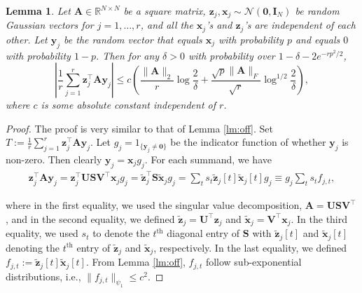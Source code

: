 \documentclass[10pt]{article}
\newcommand{\B}{\mathbf}
\newtheorem{lemma}[theorem]{Lemma}
\begin{document}
\begin{lemma}\label{lm:off2} Let $\B{A}\in \mathbb{R}^{N \times N}$ be a square matrix, $\B{z}_j, \B{x}_j\sim \mathcal{N}(\B{0},\B{I}_N)$ be random Gaussian vectors for $j=1,\ldots,r$, and all the $\B{x}_j$'s and $\B{z}_j$'s are independent of each other. Let $\B{y}_j$ be the random vector that equals $\B{x}_j$ with probability $p$ and equals $0$ with probability $1-p$. Then for any $\delta>0$ with probability over $1-\delta-2e^{-rp^2/2}$,
\[
\left|\frac{1}{r} \sum\limits_{j=1}^{r} \B{z}_j^{\top}\B{A}\B{y}_j \right| \leq c \left( \frac{\|\B{A}\|_2}{r}\log \frac{2}{\delta} + \frac{\sqrt p \|\B{A}\|_F}{\sqrt r}\log^{1/2} \frac{2}{\delta}\right),
\]
where $c$ is some absolute constant independent of $r$.
\end{lemma}

\begin{proof}
The proof is very similar to that of Lemma \ref{lm:off}. Set $T:= \frac{1}{r} \sum\limits_{j=1}^{r} \B{z}_j^{\top}\B{A}\B{y}_j $. Let $g_j=1_{\{\B{y}_j \neq \B{0}\}}$ be the indicator function of whether $\B{y}_j$ is non-zero. Then clearly $\B{y}_j=\B{x}_j g_j$. For each summand, we have
\begin{align}
\B{z}_j^{\top}\B{A}\B{y}_j = \B{z}_j^{\top}\B{U}\B{S}\B{V}^{\top}\B{x}_j g_j = \tilde{\B{z}}_j^{\top}\B{S}\tilde{\B{x}}_j g_j = \sum_t s_t \tilde{\B{z}}_j[t]\tilde{\B{x}}_j[t] g_j\equiv g_j\sum_t s_t f_{j,t},
\end{align}

where in the first equality, we used the singular value decomposition, $\B{A}=\B{U}\B{S}\B{V}^{\top}$, and in the second equality, we defined $\tilde{\B{z}}_j = \B{U}^{\top}\B{z}_j$ and $\tilde{\B{x}}_j = \B{V}^{\top} \B{x}_j$. In the third equality, we used $s_t$ to denote the $t^\text{th}$ diagonal entry of $\B{S}$ with $\tilde{\B{z}}_j[t]$ and $\tilde{\B{x}}_j[t]$ denoting the $t^\text{th}$ entry of $\tilde{\B{z}}_j$ and $\tilde{\B{x}}_j$, respectively. In the last equality, we defined $f_{j,t}:=\tilde{\B{z}}_j[t]\tilde{\B{x}}_j[t]$.
From Lemma \ref{lm:off}, $f_{j,t}$ follow sub-exponential distributions, i.e.,
$\|f_{j,t}\|_{\psi_1} \leq c^2$.


\end{proof}
\end{document}
